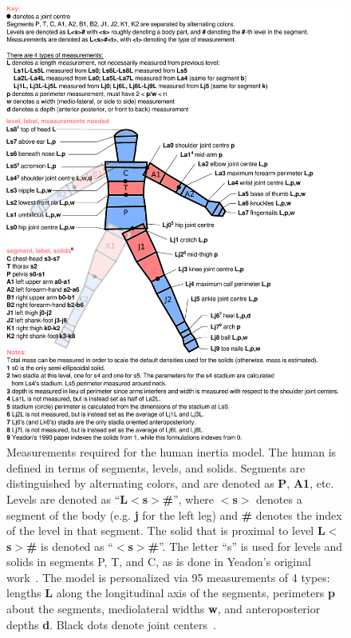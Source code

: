 \documentclass[10pt,a4paper,twocolumn]{article}
\begin{document}
\begin{figure}
  \begin{center}
    \includegraphics[width=1.6\columnwidth]{figures/measurements.pdf}
  \end{center}
  \caption{
    Measurements required for the human inertia model. The human is defined in
    terms of segments, levels, and solids. Segments are distinguished by
    alternating colors, and are denoted as \textbf{P}, \textbf{A1}, etc. Levels
    are denoted as ``\textbf{L$<$s$>$\#}'', where \textbf{$<$s$>$} denotes a
    segment of the body (e.g. \textbf{j} for the left leg) and \textbf{\#}
    denotes the index of the level in that segment. The solid that is proximal
    to level \textbf{L$<$s$>$\#} is denoted as ``\textbf{$<$s$>$\#}''. The
    letter ``s'' is used for levels and solids in segments P, T, and C, as is
    done in Yeadon's original work~\cite{Yeadon1990f}. The
    model is personalized via 95 measurements of 4 types: lengths \textbf{L}
    along the longitudinal axis of the segments, perimeters \textbf{p} about
    the segments, mediolateral widths \textbf{w}, and anteroposterior depths
    \textbf{d}. Black dots denote joint centers~\cite{Yeadon1990c}.
  }
  \label{fig:meas}
\end{figure}
\end{document}
